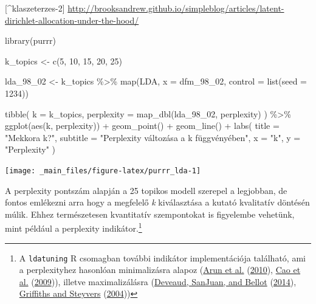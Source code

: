 \documentclass[
]{book}
\newenvironment{Shaded}{\begin{snugshade}}{\end{snugshade}}
\newcommand{\AttributeTok}[1]{\textcolor[rgb]{0.77,0.63,0.00}{#1}}
\newcommand{\DecValTok}[1]{\textcolor[rgb]{0.00,0.00,0.81}{#1}}
\newcommand{\FunctionTok}[1]{\textcolor[rgb]{0.00,0.00,0.00}{#1}}
\newcommand{\NormalTok}[1]{#1}
\newcommand{\OtherTok}[1]{\textcolor[rgb]{0.56,0.35,0.01}{#1}}
\newcommand{\SpecialCharTok}[1]{\textcolor[rgb]{0.00,0.00,0.00}{#1}}
\newcommand{\StringTok}[1]{\textcolor[rgb]{0.31,0.60,0.02}{#1}}
\begin{document}
{[}\^{}klaszeterzes-2{]}
\url{http://brooksandrew.github.io/simpleblog/articles/latent-dirichlet-allocation-under-the-hood/}

\begin{Shaded}
\begin{Highlighting}[]
\FunctionTok{library}\NormalTok{(purrr)}
\end{Highlighting}
\end{Shaded}

\begin{Shaded}
\begin{Highlighting}[]
\NormalTok{k\_topics }\OtherTok{\textless{}{-}} \FunctionTok{c}\NormalTok{(}\DecValTok{5}\NormalTok{, }\DecValTok{10}\NormalTok{, }\DecValTok{15}\NormalTok{, }\DecValTok{20}\NormalTok{, }\DecValTok{25}\NormalTok{)}

\NormalTok{lda\_98\_02 }\OtherTok{\textless{}{-}}\NormalTok{ k\_topics }\SpecialCharTok{\%\textgreater{}\%}
  \FunctionTok{map}\NormalTok{(LDA, }\AttributeTok{x =}\NormalTok{ dfm\_98\_02, }\AttributeTok{control =} \FunctionTok{list}\NormalTok{(}\AttributeTok{seed =} \DecValTok{1234}\NormalTok{))}


\FunctionTok{tibble}\NormalTok{(}
  \AttributeTok{k =}\NormalTok{ k\_topics,}
  \AttributeTok{perplexity =} \FunctionTok{map\_dbl}\NormalTok{(lda\_98\_02, perplexity)}
\NormalTok{) }\SpecialCharTok{\%\textgreater{}\%}
  \FunctionTok{ggplot}\NormalTok{(}\FunctionTok{aes}\NormalTok{(k, perplexity)) }\SpecialCharTok{+}
  \FunctionTok{geom\_point}\NormalTok{() }\SpecialCharTok{+}
  \FunctionTok{geom\_line}\NormalTok{() }\SpecialCharTok{+}
  \FunctionTok{labs}\NormalTok{(}
    \AttributeTok{title =} \StringTok{"Mekkora k?"}\NormalTok{,}
    \AttributeTok{subtitle =} \StringTok{"Perplexity változása a k függvényében"}\NormalTok{,}
    \AttributeTok{x =} \StringTok{"k"}\NormalTok{,}
    \AttributeTok{y =} \StringTok{"Perplexity"}
\NormalTok{  )}
\end{Highlighting}
\end{Shaded}

\begin{center}\texttt{[image: \_main\_files/figure-latex/purrr\_lda-1]} \end{center}

A perplexity pontszám alapján a 25 topikos modell szerepel a legjobban,
de fontos emlékezni arra hogy a megfelelő \emph{k} kiválasztása a kutató
kvalitatív döntésén múlik. Ehhez természetesen kvantitatív szempontokat
is figyelembe vehetünk, mint például a perplexity indikátor.\footnote{A
  \texttt{ldatuning} R csomagban további indikátor implementációja
  található, ami a perplexityhez hasonlóan minimalizásra alapoz
  (\protect\hyperlink{ref-arun2010finding}{Arun et al.}
  (\protect\hyperlink{ref-arun2010finding}{2010}),
  \protect\hyperlink{ref-cao2009density}{Cao et al.}
  (\protect\hyperlink{ref-cao2009density}{2009})), illetve
  maximalizálásra (\protect\hyperlink{ref-deveaud2014accurate}{Deveaud,
  SanJuan, and Bellot}
  (\protect\hyperlink{ref-deveaud2014accurate}{2014}),
  \protect\hyperlink{ref-griffiths2004}{Griffiths and Steyvers}
  (\protect\hyperlink{ref-griffiths2004}{2004}))}
\end{document}
